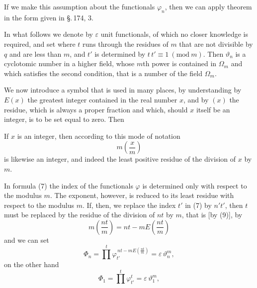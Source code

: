 If we make this assumption about the functionals $\varphi_n$, then
we can apply  theorem in the form given in
\S.\,174, 3.

In what follows we denote by $\varepsilon$ unit functionals, of
which no closer knowledge is required, and set
where $t$ runs through the residues of $m$ that are not divisible by
$q$ and are less than $m$, and $t'$ is determined by
$t\,t' \equiv 1\ (\mathrm{mod}\ m)$. Then $\vartheta_n$ is a
cyclotomic number in a higher field, whose $m$th power is contained
in $\Omega_m$ and which satisfies the second condition, that
is a number of the field $\Omega_m$.

We now introduce a symbol that is used in many places, by
understanding by $E(x)$ the greatest integer contained in the real
number $x$, and by $(x)$ the residue, which is always a proper
fraction and which, should $x$ itself be an integer, is to be set
equal to zero. Then

If $x$ is an integer, then according to this mode of notation
\[
m \left(\frac{x}{m}\right)
\]
is likewise an integer, and indeed the least positive residue of the
division of $x$ by $m$.

In formula (7) the index of the functionals $\varphi$ is determined
only with respect to the modulus $m$. The exponent, however, is
reduced to its least residue with respect to the modulus $m$. If,
then, we replace the index $t'$ in (7) by $n' t'$, then $t$ must be
replaced by the residue of the division of $n t$ by $m$, that is
[by (9)], by
\[
m \left(\frac{n t}{m}\right) = n t - m E\left(\frac{n t}{m}\right)
\]
and we can set
\[
\Phi_n = \prod^{t} \varphi_{t'}^{\,n t - m E\left(\frac{n t}{m}\right)} = \varepsilon\, \vartheta_n^m,
\]
on the other hand
\[
\Phi_1 = \prod^{t} \varphi_{t'}^{t} = \varepsilon\, \vartheta_1^m,
\]
